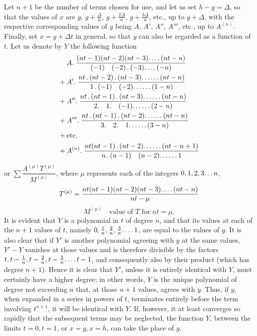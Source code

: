Let $n+1$ be the number of terms chosen for use, and let us set $h-g=\Delta$, so that the values of $x$ are $g$, $g+\frac{\Delta}{n}$, $g+\frac{2\Delta}{n}$, $g+\frac{3\Delta}{n}$, etc., up to $g+\Delta$, with the respective corresponding values of $y$ being $A$, $A'$, $A''$, $A'''$, etc., up to $A^{(n)}$. Finally, set $x=g+\Delta t$ in general, so that $y$ can also be regarded as a function of $t$. Let us denote by $Y$ the following function
\[
\begin{aligned}
&A.\;\frac{(nt-1)(nt-2)(nt-3)\ldotp\ldotp\ldotp\ldotp(nt-n)}{(-1)\quad(-2)\, .\,(-3)\ldotp\ldotp\ldotp\ldotp(-n)}\\
{}+{}&A'.\;\frac{nt\, .\,(nt-2)\, .\,(nt-3)\ldotp\ldotp\ldotp\ldotp\ldotp\ldotp(nt-n)}{1\, .\,(-1)\quad(-2)\ldotp\ldotp\ldotp\ldotp\ldotp\ldotp(1-n)}\\
{}+{}&A''.\;\frac{nt\, .\,(nt-1)\, .\,(nt-3)\ldotp\ldotp\ldotp\ldotp\ldotp\ldotp(nt-n)}{2.\quad1.\quad(-1)\ldotp\ldotp\ldotp\ldotp\ldotp\ldotp(2-n)}\\
{}+{}&A'''.\;\frac{nt\, .\,(nt-1)\, .\,(nt-2)\ldotp\ldotp\ldotp\ldotp\ldotp\ldotp(nt-n)}{3.\quad2.\quad1\ldotp\ldotp\ldotp\ldotp\ldotp\ldotp(3-n)}\\
{}+{}&\text{etc.}\\
{}+{}&A^{(n)}.\;\frac{nt(nt-1)\, .\,(nt-2)\ldotp\ldotp\ldotp\ldotp\ldotp\ldotp(nt-n+1)}{n\, .\,(n-1)\quad(n-2)\ldotp\ldotp\ldotp\ldotp\ldotp\ldotp1}
\end{aligned}
\]
or $\sum\dfrac{A^{(\mu)}T^{(\mu)}}{M^{(\mu)}}$, where $\mu$ represents each of the integers $0,1,2,3\ldotp\ldotp\ldotp n$,
\[
T^{(\mu)}=\frac{nt(nt-1)(nt-2)(nt-3)\ldotp\ldotp\ldotp\ldotp(nt-n)}{nt-\mu}
\]
\[
M^{(\mu)}\quad\text{value of }T\text{ for }nt=\mu.
\]
It is evident that $Y$ is a polynomial in $t$ of degree $n$, and that its values at each of the $n+1$ values of $t$, namely $0,\frac1n,\frac2n,\frac3n\ldotp\ldotp\ldotp\ldotp1$, are equal to the values of $y$. It is also clear that if $Y'$ is another polynomial agreeing with $y$ at the same values, $Y'-Y$ vanishes at those values and is therefore divisible by the factors $t,t-\frac1n,t-\frac2n,t-\frac3n\ldotp\ldotp\ldotp\ldotp t-1$, and consequently also by their product (which has degree $n+1$). Hence it is clear that $Y'$, unless it is entirely identical with $Y$, must certainly have a higher degree; in other words, $Y$ is the unique polynomial of degree not exceeding $n$ that, at those $n+1$ values, agrees with $y$. Thus, if $y$, when expanded in a series in powers of $t$, terminates entirely before the term involving $t^{n+1}$, it will be identical with $Y$. If, however, it at least converges so rapidly that the subsequent terms may be neglected, the function $Y$, between the limits $t=0,t=1$, or $x=g,x=h$, can take the place of $y$.


